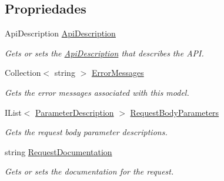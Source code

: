 \subsection*{Propriedades}
\begin{DoxyCompactItemize}
\item 
Api\+Description \hyperlink{classApi3Layers_1_1Areas_1_1HelpPage_1_1Models_1_1HelpPageApiModel_ad1a6fd4ef907b1fdba9bba7d46fe5992}{Api\+Description}
\begin{DoxyCompactList}\small\item\em Gets or sets the \hyperlink{classApi3Layers_1_1Areas_1_1HelpPage_1_1Models_1_1HelpPageApiModel_ad1a6fd4ef907b1fdba9bba7d46fe5992}{Api\+Description} that describes the A\+PI. \end{DoxyCompactList}\item 
Collection$<$ string $>$ \hyperlink{classApi3Layers_1_1Areas_1_1HelpPage_1_1Models_1_1HelpPageApiModel_ad066016c7ca05c83bd336000adaa9a34}{Error\+Messages}
\begin{DoxyCompactList}\small\item\em Gets the error messages associated with this model. \end{DoxyCompactList}\item 
I\+List$<$ \hyperlink{classApi3Layers_1_1Areas_1_1HelpPage_1_1ModelDescriptions_1_1ParameterDescription}{Parameter\+Description} $>$ \hyperlink{classApi3Layers_1_1Areas_1_1HelpPage_1_1Models_1_1HelpPageApiModel_afa8a93fe41667b75d8e8bb82464b0ce9}{Request\+Body\+Parameters}
\begin{DoxyCompactList}\small\item\em Gets the request body parameter descriptions. \end{DoxyCompactList}\item 
string \hyperlink{classApi3Layers_1_1Areas_1_1HelpPage_1_1Models_1_1HelpPageApiModel_a444fbff8827e51d426af83b50f6f09db}{Request\+Documentation}
\begin{DoxyCompactList}\small\item\em Gets or sets the documentation for the request. \end{DoxyCompactList}\item 

\end{DoxyCompactItemize}

